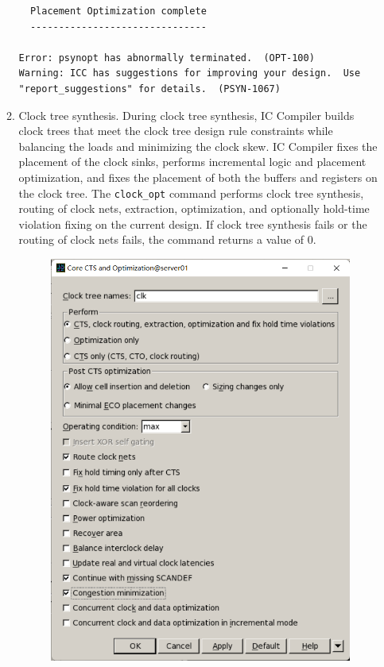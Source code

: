 \documentclass[a4paper,12pt,twoside]{article}
\begin{document}
\begin{enumerate}
\begin{enumerate}
\begin{verbatim}
  Placement Optimization complete
  -------------------------------

Error: psynopt has abnormally terminated.  (OPT-100)
Warning: ICC has suggestions for improving your design.  Use "report_suggestions" for details.  (PSYN-1067)
        \end{verbatim}
        \item Clock tree synthesis. During clock tree synthesis, IC Compiler builds clock trees that meet the clock tree design rule constraints while balancing the loads and minimizing the clock skew. IC Compiler fixes the placement of the clock sinks, performs incremental logic and placement optimization, and fixes the placement of both the buffers and registers on the clock tree. The \texttt{clock\_opt} command performs clock tree synthesis, routing of clock nets, extraction, optimization, and optionally hold-time violation fixing on the current design. If clock tree synthesis fails or the routing of clock nets fails, the command returns a value of 0.
        \begin{figure}[H]
            \centering
            \includegraphics[width=\textwidth]{images/18.png}

\end{figure}
\end{enumerate}
\end{enumerate}
\end{document}

